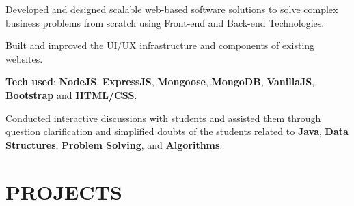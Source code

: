 \documentclass[]{deedy-resume-openfont}
\begin{document}
\begin{minipage}[t]{0.66\textwidth}
\begin{tightemize}
\end{tightemize}
\vspace{5pt}

\begin{tightemize}

\item Developed and designed scalable web-based software solutions to solve complex business problems from scratch using Front-end and Back-end Technologies.

\item Built and improved the UI/UX infrastructure and components of existing websites.

\item \textbf{Tech used}: \textbf{NodeJS}, \textbf{ExpressJS}, \textbf{Mongoose}, \textbf{MongoDB}, \textbf{VanillaJS}, \textbf{Bootstrap} and \textbf{HTML/CSS}.


\end{tightemize}
\vspace{5pt}

\begin{tightemize}
\item Conducted interactive discussions with students and assisted them through question clarification and simplified doubts of the students related to \textbf{Java}, \textbf{Data Structures}, \textbf{Problem Solving}, and \textbf{Algorithms}. 

\end{tightemize}


\section{PROJECTS}



\end{minipage}
\end{document}
